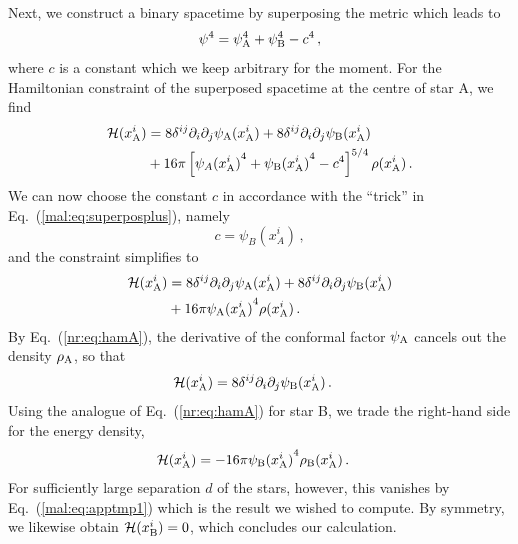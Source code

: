 Next, we construct a binary spacetime by superposing the metric
which leads to
%
\begin{equation}
    \psi^4 = \psi_{\rm A}^4 + \psi_{\rm B}^4-c^4\,,
\end{equation}
%
where $c$ is a constant which we keep arbitrary for the moment.
For the Hamiltonian constraint of the superposed spacetime
at the centre of star A, we find
%
\begin{equation}
\begin{aligned}
    \mathcal{H}(x_{\rm A}^{i}) &=  8 \delta^{ij} \partial_i\partial_j{\psi_{\rm A}({x_{\rm A}^{i}})} + 8 \delta^{ij} \partial_i\partial_j{\psi_{\rm B}({x_{\rm A}^{i}})}\\ &+  16\pi \left[{\psi_{A}({x_{\rm A}^{i}})}^4 + {\psi_{\rm B}({x_{\rm A}^{i}})}^4-c^4\right]^{5/4}\rho(x_{\rm A}^{i})\,.
\end{aligned}
\end{equation}
%
We can now choose the constant $c$ in
accordance with the ``trick'' in Eq.~(\ref{mal:eq:superposplus}),
namely
%
\begin{equation}
   c = \psi_B(x_A^{i})\,,
\end{equation}
%
and the constraint simplifies to
\begin{equation}
\begin{aligned}
    \mathcal{H}(x_{\rm A}^{i}) &=  8 \delta^{ij} \partial_i\partial_j{\psi_{\rm A}({x_{\rm A}^{i}})} + 8 \delta^{ij} \partial_i\partial_j{\psi_{\rm B}({x_{\rm A}^{i}})}\\ &+  16\pi {\psi_{\rm A}({x_{\rm A}^{i}})}^4 \rho(x_{\rm A}^{i})\,.
\end{aligned}
\end{equation}
%
By Eq.~(\ref{nr:eq:hamA}), the derivative of the conformal factor
$\psi_{\rm A}$ cancels out the density $\rho_{\rm A}$,
so that
%
\begin{equation}
\begin{aligned}
    \mathcal{H}(x_{\rm A}^{i}) &=   8 \delta^{ij} \partial_i\partial_j{\psi_{\rm B}({x_{\rm A}^{i}})}\,.
\end{aligned}
\end{equation}
%
Using the analogue of Eq.~(\ref{nr:eq:hamA}) for star B, we trade
the right-hand side for the energy density,
%
\begin{equation}
\begin{aligned}
    \mathcal{H}(x_{\rm A}^{i}) &=   - 16\pi {\psi_{\rm B}({x_{\rm A}^{i}})}^4 \rho_{\rm B}(x_{\rm A}^{i})\,.
\end{aligned}
\end{equation}
%
For sufficiently large separation $d$ of the stars, however,
this vanishes by Eq.~(\ref{mal:eq:apptmp1}) which is the result
we wished to compute. By symmetry, we likewise obtain
$\mathcal{H}(x_{\rm B}^i)=0$, which concludes our calculation.

